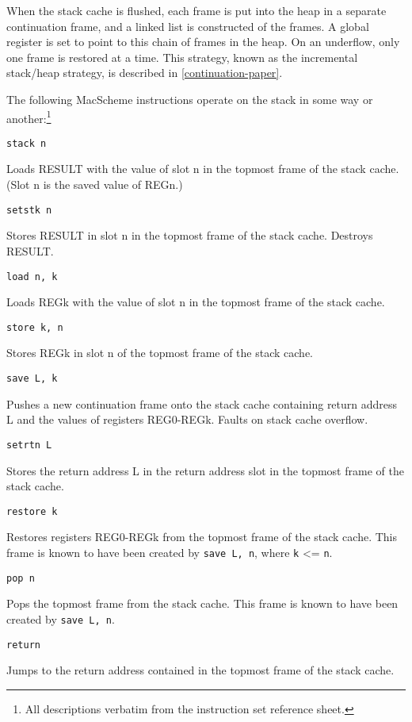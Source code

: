 When the stack cache is flushed, each frame is put into the heap in a
separate continuation frame, and a linked list is constructed of the
frames. A global register is set to point to this chain of frames in
the heap. On an underflow, only one frame is restored at a time. This
strategy, known as the incremental stack/heap strategy, is described
in \ref{continuation-paper}.

The following MacScheme instructions operate on the stack in some way
or another:\footnote{All descriptions verbatim from the instruction
set reference sheet.}

\begin{description}

\item \verb+stack n+

Loads RESULT with the value of slot n in the topmost frame of the stack cache.
(Slot n is the saved value of REGn.)

\item \verb+setstk n+

Stores RESULT in slot n in the topmost frame of the stack cache. Destroys
RESULT.

\item \verb+load n, k+

Loads REGk with the value of slot n in the topmost frame of the stack cache.

\item \verb+store k, n+

Stores REGk in slot n of the topmost frame of the stack cache.

\item \verb+save L, k+

Pushes a new continuation frame onto the stack cache containing return address
L and the values of registers REG0-REGk. Faults on stack cache overflow.

\item \verb+setrtn L+

Stores the return address L in the return address slot in the topmost frame
of the stack cache.

\item \verb+restore k+

Restores registers REG0-REGk from the topmost frame of the stack
cache.  This frame is known to have been created by \verb+save L, n+,
where {\tt k} <= {\tt n}.

\item \verb+pop n+

Pops the topmost frame from the stack cache.  This frame is known
to have been created by \verb+save L, n+.

\item \verb+return+

Jumps to the return address contained in the topmost frame of
the stack cache.

\end{description}

